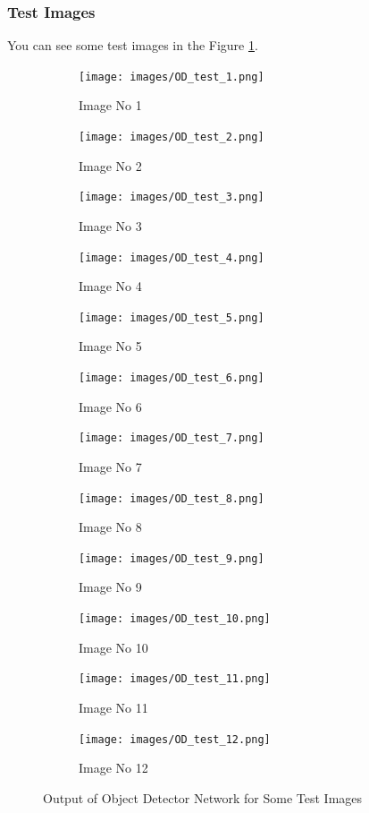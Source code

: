\documentclass[a4paper, openany]{book}
\begin{document}
\newpage

\subsubsection{Test Images}
	\vspace{0.3cm}
	
You can see some test images in the Figure \ref{fig:OD_t_images}.

\begin{figure}[ht]
  \centering
  \begin{subfigure}[b]{0.3\linewidth}
    \texttt{[image: images/OD\_test\_1.png]}
    \caption{Image No 1}
  \end{subfigure}
  \begin{subfigure}[b]{0.3\linewidth}
    \texttt{[image: images/OD\_test\_2.png]}
    \caption{Image No 2}
  \end{subfigure}
    \begin{subfigure}[b]{0.3\linewidth}
    \texttt{[image: images/OD\_test\_3.png]}
    \caption{Image No 3}
  \end{subfigure}
  \begin{subfigure}[b]{0.3\linewidth}
    \texttt{[image: images/OD\_test\_4.png]}
    \caption{Image No 4}
  \end{subfigure}
  \begin{subfigure}[b]{0.3\linewidth}
    \texttt{[image: images/OD\_test\_5.png]}
    \caption{Image No 5}
  \end{subfigure}
    \begin{subfigure}[b]{0.3\linewidth}
    \texttt{[image: images/OD\_test\_6.png]}
    \caption{Image No 6}
  \end{subfigure}
  \begin{subfigure}[b]{0.3\linewidth}
    \texttt{[image: images/OD\_test\_7.png]}
    \caption{Image No 7}
  \end{subfigure}
  \begin{subfigure}[b]{0.3\linewidth}
    \texttt{[image: images/OD\_test\_8.png]}
    \caption{Image No 8}
  \end{subfigure}
    \begin{subfigure}[b]{0.3\linewidth}
    \texttt{[image: images/OD\_test\_9.png]}
    \caption{Image No 9}
  \end{subfigure}
  \begin{subfigure}[b]{0.3\linewidth}
    \texttt{[image: images/OD\_test\_10.png]}
    \caption{Image No 10}
  \end{subfigure}
  \begin{subfigure}[b]{0.3\linewidth}
    \texttt{[image: images/OD\_test\_11.png]}
    \caption{Image No 11}
  \end{subfigure}
    \begin{subfigure}[b]{0.3\linewidth}
    \texttt{[image: images/OD\_test\_12.png]}
    \caption{Image No 12}
  \end{subfigure}
  \caption{Output of Object Detector Network for Some Test Images}
  \label{fig:OD_t_images}
\end{figure}
\end{document}
